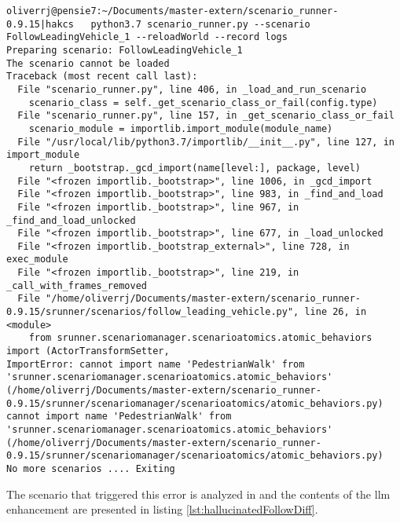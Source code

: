 \begin{lstlisting}[caption={Error message when running the the initially enhanced  FollowLeadingVehicle scenario with halluciantion. }, label={lst:hallucinatedFollowError}]
    oliverrj@pensie7:~/Documents/master-extern/scenario_runner-0.9.15|hakcs   python3.7 scenario_runner.py --scenario FollowLeadingVehicle_1 --reloadWorld --record logs
Preparing scenario: FollowLeadingVehicle_1
The scenario cannot be loaded
Traceback (most recent call last):
  File "scenario_runner.py", line 406, in _load_and_run_scenario
    scenario_class = self._get_scenario_class_or_fail(config.type)
  File "scenario_runner.py", line 157, in _get_scenario_class_or_fail
    scenario_module = importlib.import_module(module_name)
  File "/usr/local/lib/python3.7/importlib/__init__.py", line 127, in import_module
    return _bootstrap._gcd_import(name[level:], package, level)
  File "<frozen importlib._bootstrap>", line 1006, in _gcd_import
  File "<frozen importlib._bootstrap>", line 983, in _find_and_load
  File "<frozen importlib._bootstrap>", line 967, in _find_and_load_unlocked
  File "<frozen importlib._bootstrap>", line 677, in _load_unlocked
  File "<frozen importlib._bootstrap_external>", line 728, in exec_module
  File "<frozen importlib._bootstrap>", line 219, in _call_with_frames_removed
  File "/home/oliverrj/Documents/master-extern/scenario_runner-0.9.15/srunner/scenarios/follow_leading_vehicle.py", line 26, in <module>
    from srunner.scenariomanager.scenarioatomics.atomic_behaviors import (ActorTransformSetter,
ImportError: cannot import name 'PedestrianWalk' from 'srunner.scenariomanager.scenarioatomics.atomic_behaviors' (/home/oliverrj/Documents/master-extern/scenario_runner-0.9.15/srunner/scenariomanager/scenarioatomics/atomic_behaviors.py)
cannot import name 'PedestrianWalk' from 'srunner.scenariomanager.scenarioatomics.atomic_behaviors' (/home/oliverrj/Documents/master-extern/scenario_runner-0.9.15/srunner/scenariomanager/scenarioatomics/atomic_behaviors.py)
No more scenarios .... Exiting

\end{lstlisting}

The scenario that triggered this error is analyzed in  and the
contents of the \acrshort{llm} enhancement are presented in listing
\ref{lst:hallucinatedFollowDiff}.


